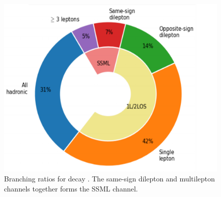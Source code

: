 \documentclass[../thesis.tex]{subfiles}
\begin{document}
\begin{figure}[!t]
\centering
\includegraphics[width=0.7\linewidth]{fig/theory_tttt_channels.png}
\caption[Branching ratios for \tttt decay. The same-sign dilepton and multilepton channels together forms the SSML channel.]{\label{fig:theory:tttt_channels}Branching ratios for \tttt decay \citep{Sabatini:2784150}. The same-sign dilepton and multilepton channels together forms the \acs{SSML} channel.}
\end{figure}




\end{document}
